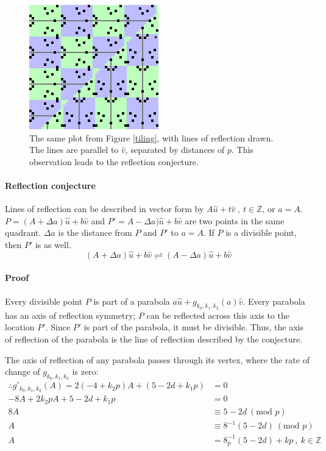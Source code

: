 \documentclass{article}
\begin{document}
\begin{figure}[h!]
	\centering
	\includegraphics{reflection}
	\caption{The same plot from Figure \ref{tiling}, with lines of reflection drawn. The lines are parallel to \(\hat{v}\), separated by distances of \(p\). This observation leads to the reflection conjecture.}
	\label{reflection}
\end{figure}
	
\paragraph{Reflection conjecture} Lines of reflection can be described in vector form by \(A\hat{u}+t\hat{v}\ ,\ t \in \mathbb{Z}\), or \(a=A\). \(P = (A + \Delta a)\hat{u}+b\hat{v}\) and \(P' = A - \Delta a)\hat{u}+b\hat{v}\) are two points in the same quadrant. \(\Delta a\) is the distance from \(P\) and \(P'\) to \(a=A\). If \(P\) is a divisible point, then \(P'\) is as well.
	\[(A + \Delta a)\hat{u}+b\hat{v} \rightleftharpoons (A - \Delta a)\hat{u}+b\hat{v}\]

\paragraph{Proof} Every divisible point \(P\) is part of a parabola \(a\hat{u}+g_{k_0,k_1,k_2}(a)\hat{v}\). Every parabola has an axis of reflection symmetry; \(P\) can be reflected across this axis to the location \(P'\). Since \(P'\) is part of the parabola, it must be divisible. Thus, the axis of reflection of the parabola is the line of reflection described by the conjecture.

The axis of reflection of any parabola passes through its vertex, where the rate of change of \(g_{k_0,k_1,k_2}\) is zero:
\begin{align}
	\nonumber \therefore g'_{k_0,k_1,k_2}(A) = 2(-4 + k_2p)A + (5 - 2d + k_1p) &= 0 \\
	\nonumber -8A + 2k_2pA + 5 - 2d + k_1p &= 0 \\
	\nonumber 8A &\equiv 5 - 2d\ (\text{mod }p) \\
	\nonumber A &\equiv 8^{-1}(5 - 2d)\ (\text{mod }p) \\
	\nonumber A &= 8^{-1}_p(5 - 2d) + kp\ ,\ k \in \mathbb{Z}
\end{align}
	
\end{document}
